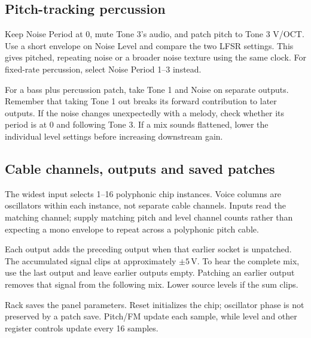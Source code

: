\subsection{Pitch-tracking percussion}
Keep Noise Period at 0, mute Tone 3's audio, and patch pitch to Tone 3 V/OCT.
Use a short envelope on Noise Level and compare the two LFSR settings.
This gives pitched, repeating noise or a broader noise texture using the
same clock. For fixed-rate percussion, select Noise Period 1--3 instead.

For a bass plus percussion patch, take Tone 1 and Noise on separate outputs.
Remember that taking Tone 1 out breaks its forward contribution to later
outputs. If the noise changes unexpectedly with a melody, check whether its
period is at 0 and following Tone 3. If a mix sounds flattened, lower the
individual level settings before increasing downstream gain.

\subsection{Cable channels, outputs and saved patches}
The widest input selects 1--16 polyphonic chip instances. Voice columns are
oscillators within each instance, not separate cable channels. Inputs read
the matching channel; supply matching pitch and level channel counts rather
than expecting a mono envelope to repeat across a polyphonic pitch cable.

Each output adds the preceding output when that earlier socket is unpatched.
The accumulated signal clips at approximately $\pm5$\,V. To hear the complete
mix, use the last output and leave earlier outputs empty. Patching an earlier
output removes that signal from the following mix. Lower source levels if
the sum clips.

Rack saves the panel parameters. Reset initializes the chip; oscillator
phase is not preserved by a patch save. Pitch/FM update each sample, while
level and other register controls update every 16 samples.
